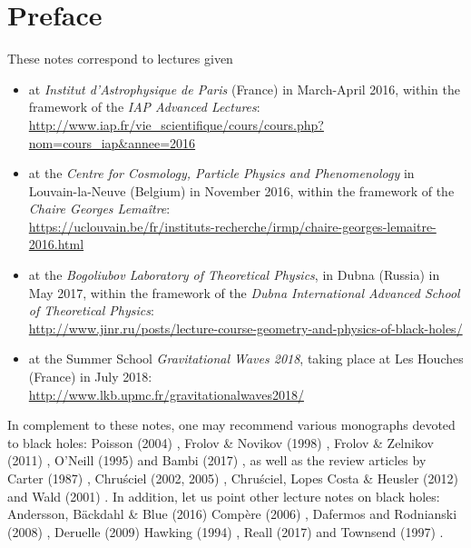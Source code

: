 \chapter*{Preface}

These notes correspond to lectures given
\begin{itemize}
\item at \emph{Institut d'Astrophysique de Paris} (France) in March-April 2016, within the
framework of the \emph{IAP Advanced Lectures}:\\
{\small\url{http://www.iap.fr/vie_scientifique/cours/cours.php?nom=cours_iap&annee=2016}}
\item at the \emph{Centre for Cosmology, Particle Physics and Phenomenology} in Louvain-la-Neuve
(Belgium) in November 2016, within the framework of the \emph{Chaire Georges Lemaître}:\\
{\small \url{https://uclouvain.be/fr/instituts-recherche/irmp/chaire-georges-lemaitre-2016.html}}
\item at the
\emph{Bogoliubov Laboratory of Theoretical Physics}, in Dubna (Russia) in May 2017,
within the framework of the \emph{Dubna International Advanced School of Theoretical Physics}:\\
{\small\url{http://www.jinr.ru/posts/lecture-course-geometry-and-physics-of-black-holes/}}
\item at the Summer School \emph{Gravitational Waves 2018}, taking place at Les Houches
(France) in July 2018:\\
{\small\url{http://www.lkb.upmc.fr/gravitationalwaves2018/}}
\end{itemize}

\vspace{2ex}

In complement to these notes, one may recommend various monographs
devoted to black holes: Poisson (2004) \cite{Poiss04}, Frolov \& Novikov (1998) \cite{FroloN98},
Frolov \& Zelnikov (2011) \cite{FroloZ11}, O'Neill (1995) \cite{ONeil95}
and Bambi (2017) \cite{Bambi17}, as well as the review
articles by Carter (1987) \cite{Carte87}, Chru\'sciel (2002, 2005) \cite{Chrus02, Chrus05},
Chru\'sciel, Lopes Costa \& Heusler (2012) \cite{ChrusLH12} and Wald (2001) \cite{Wald01}.
In addition, let us point other lecture notes on black holes:
Andersson, Bäckdahl \& Blue (2016) \cite{AnderBB16}
Compère (2006) \cite{Compe06},
Dafermos and Rodnianski (2008) \cite{DaferR13},  Deruelle (2009) \cite{Derue09}
Hawking (1994) \cite{Hawki94,HawkiP15}, Reall (2017) \cite{Reall16} and Townsend (1997) \cite{Towns97}.

